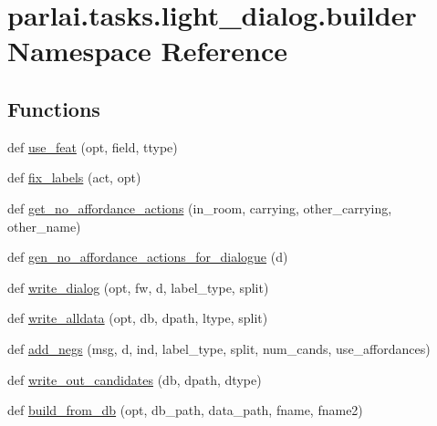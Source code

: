 \hypertarget{namespaceparlai_1_1tasks_1_1light__dialog_1_1builder}{}\section{parlai.\+tasks.\+light\+\_\+dialog.\+builder Namespace Reference}
\label{namespaceparlai_1_1tasks_1_1light__dialog_1_1builder}
\subsection*{Functions}
\begin{DoxyCompactItemize}
\item 
def \hyperlink{namespaceparlai_1_1tasks_1_1light__dialog_1_1builder_ad9de2827ebcf8386662e48c7fe011e43}{use\+\_\+feat} (opt, field, ttype)
\item 
def \hyperlink{namespaceparlai_1_1tasks_1_1light__dialog_1_1builder_aafb760ba2e05ffe5cad429327d0dd347}{fix\+\_\+labels} (act, opt)
\item 
def \hyperlink{namespaceparlai_1_1tasks_1_1light__dialog_1_1builder_a51921236462b49d240bfde4a648c3ec3}{get\+\_\+no\+\_\+affordance\+\_\+actions} (in\+\_\+room, carrying, other\+\_\+carrying, other\+\_\+name)
\item 
def \hyperlink{namespaceparlai_1_1tasks_1_1light__dialog_1_1builder_a537e075c89058b67eb0db786f98491de}{gen\+\_\+no\+\_\+affordance\+\_\+actions\+\_\+for\+\_\+dialogue} (d)
\item 
def \hyperlink{namespaceparlai_1_1tasks_1_1light__dialog_1_1builder_a233ecce0ba4b1a0c023e855629986d69}{write\+\_\+dialog} (opt, fw, d, label\+\_\+type, split)
\item 
def \hyperlink{namespaceparlai_1_1tasks_1_1light__dialog_1_1builder_aeb144d0ebd2fd1727f73677e36f2c8b5}{write\+\_\+alldata} (opt, db, dpath, ltype, split)
\item 
def \hyperlink{namespaceparlai_1_1tasks_1_1light__dialog_1_1builder_a2f5cb4927740a90c9fba84df5e8e16b5}{add\+\_\+negs} (msg, d, ind, label\+\_\+type, split, num\+\_\+cands, use\+\_\+affordances)
\item 
def \hyperlink{namespaceparlai_1_1tasks_1_1light__dialog_1_1builder_a25aca9f28e4406290624e1d0c5cce0d6}{write\+\_\+out\+\_\+candidates} (db, dpath, dtype)
\item 
def \hyperlink{namespaceparlai_1_1tasks_1_1light__dialog_1_1builder_a6a049254e487c29d008f875476ffd76f}{build\+\_\+from\+\_\+db} (opt, db\+\_\+path, data\+\_\+path, fname, fname2)
\end{DoxyCompactItemize}
